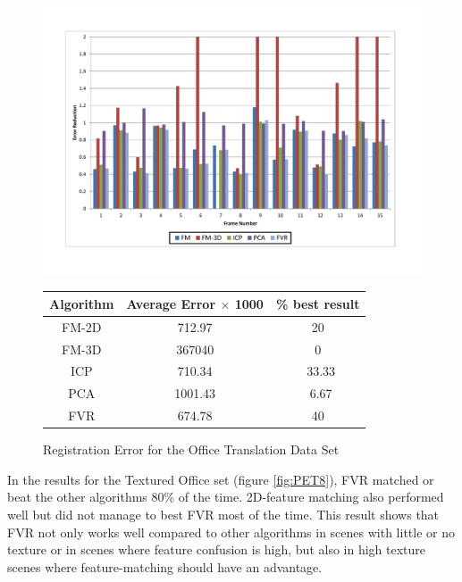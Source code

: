\begin{figure}
\centering
\includegraphics[width=6in]{images/results/Office_TexturedItems_Translation}
\caption{Registration Error for the Office Translation Data Set}
\label{fig:PET8}

\begin{tabular}{ccc}
\hline
\textbf{Algorithm} & \textbf{Average Error $\times$ 1000} & \textbf{\% best result}\\ \hline
FM-2D	& 712.97 & 20\\
FM-3D	& 367040 & 0\\
ICP		& 710.34 & ~33.33\\
PCA		& 1001.43 & ~6.67\\
FVR		& 674.78 & 40\\
\end{tabular}
\label{tab:PET8ST}
\end{figure} 


In the results for the Textured Office set (figure \ref{fig:PET8}), FVR matched or beat the other algorithms 80\% of the time. 2D-feature matching also performed well but did not manage to best FVR most of the time. This result shows that FVR not only works well compared to other algorithms in scenes with little or no texture or in scenes where feature confusion is high, but also in high texture scenes where feature-matching should have an advantage. \\


